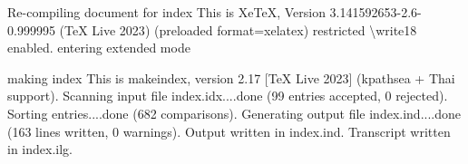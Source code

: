 \documentclass[
  letterpaper,
]{book}
\newenvironment{Shaded}{\begin{snugshade}}{\end{snugshade}}
\newcommand{\BuiltInTok}[1]{\textcolor[rgb]{0.00,0.23,0.31}{#1}}
\newcommand{\DataTypeTok}[1]{\textcolor[rgb]{0.68,0.00,0.00}{#1}}
\newcommand{\ErrorTok}[1]{\textcolor[rgb]{0.68,0.00,0.00}{#1}}
\newcommand{\ExtensionTok}[1]{\textcolor[rgb]{0.00,0.23,0.31}{#1}}
\newcommand{\KeywordTok}[1]{\textcolor[rgb]{0.00,0.23,0.31}{#1}}
\newcommand{\NormalTok}[1]{\textcolor[rgb]{0.00,0.23,0.31}{#1}}
\begin{document}
\begin{Shaded}
\begin{Highlighting}[]
  \ExtensionTok{Re{-}compiling}\NormalTok{ document for index}
  \ExtensionTok{This}\NormalTok{ is XeTeX, Version 3.141592653{-}2.6{-}0.999995 }\ErrorTok{(}\ExtensionTok{TeX}\NormalTok{ Live 2023}\KeywordTok{)} \KeywordTok{(}\ExtensionTok{preloaded}\NormalTok{ format=xelatex}\KeywordTok{)}
   \ExtensionTok{restricted} \DataTypeTok{\textbackslash{}w}\NormalTok{rite18 enabled.}
  \ExtensionTok{entering}\NormalTok{ extended mode}

\ExtensionTok{making}\NormalTok{ index}
  \ExtensionTok{This}\NormalTok{ is makeindex, version 2.17 [TeX Live 2023] }\ErrorTok{(}\ExtensionTok{kpathsea}\NormalTok{ + Thai support}\KeywordTok{)}\BuiltInTok{.}
  \ExtensionTok{Scanning}\NormalTok{ input file index.idx....done }\ErrorTok{(}\ExtensionTok{99}\NormalTok{ entries accepted, 0 rejected}\KeywordTok{)}\BuiltInTok{.}
  \ExtensionTok{Sorting}\NormalTok{ entries....done }\ErrorTok{(}\ExtensionTok{682}\NormalTok{ comparisons}\KeywordTok{)}\BuiltInTok{.}
  \ExtensionTok{Generating}\NormalTok{ output file index.ind....done }\ErrorTok{(}\ExtensionTok{163}\NormalTok{ lines written, 0 warnings}\KeywordTok{)}\BuiltInTok{.}
  \ExtensionTok{Output}\NormalTok{ written in index.ind.}
  \ExtensionTok{Transcript}\NormalTok{ written in index.ilg.}


\end{Highlighting}
\end{Shaded}
\end{document}

